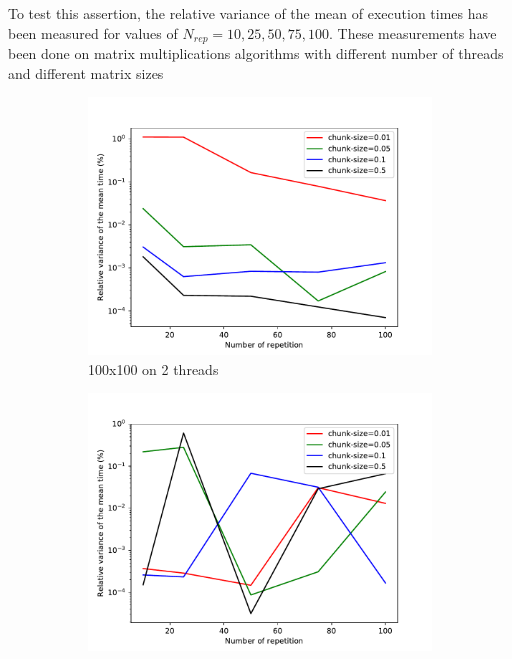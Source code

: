 \documentclass[12pt]{article}
\begin{document}
To test this assertion, the relative variance of the mean of execution times has been measured for values of $N_{rep}=10,25,50,75,100$. These measurements have been done on matrix multiplications algorithms with different number of threads and different matrix sizes
\begin{figure}
	\centering
	\begin{subfigure}[b]{0.475\textwidth}
		\centering
		\includegraphics[width=\textwidth]{images/relvar_100_2.pdf}
		\caption[Network2]%
		{{\small 100x100 on 2 threads}}    
	\end{subfigure}
	\hfill
	\begin{subfigure}[b]{0.475\textwidth}  
		\centering 
		\includegraphics[width=\textwidth]{images/relvar_500_2.pdf}

\end{subfigure}
\end{figure}
\end{document}

